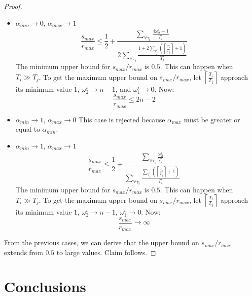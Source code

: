 \begin{proof}
\begin{itemize}
\item $\alpha_{min}\rightarrow0,\,\alpha_{max}\rightarrow1$
\begin{equation}
\frac{s_{max}}{r_{max}}\le\frac{1}{2}+\frac{\sum_{\forall\tau_{i}}\frac{4\omega_{2}^{i}-1}{T_{i}}}{2\sum_{\forall\tau_{i}}\frac{1+2\sum_{\tau_{j}^{*}}\left(\left\lceil \frac{T_{i}}{T_{j}}\right\rceil +1\right)}{T_{i}}}\label{eq:lcm rma lock-free comparison 4}
\end{equation}
The minimum upper bound for $s_{max}/r_{max}$ is $0.5$. This can
happen when $T_{i}\gg T_{j}$. To get the maximum upper bound on $s_{max}/r_{max}$,
let $\left\lceil \frac{T_{i}}{T_{j}}\right\rceil $ approach its
minimum value $1$, $\omega_{2}^{i}\rightarrow n-1$, and $\omega_{1}^{i}\rightarrow0$. 
Now:
\[
\frac{s_{max}}{r_{max}}\le2n-2
\]

\item $\alpha_{min}\rightarrow1,\,\alpha_{max}\rightarrow0$
This case is rejected because $\alpha_{max}$ must be greater or equal
to $\alpha_{min}$.

\item $\alpha_{min}\rightarrow1,\,\alpha_{max}\rightarrow1$
\begin{equation}
\frac{s_{max}}{r_{max}}\le\frac{1}{2}+\frac{\sum_{\forall\tau_{i}}\frac{\omega_{2}^{i}}{T_{i}}}{\sum_{\forall\tau_{i}}\frac{\sum_{\tau_{j}^{*}}\left(\left\lceil \frac{T_{i}}{T_{j}}\right\rceil +1\right)}{T_{i}}}\label{eq:lcm rma lock-free comparison 5}
\end{equation}
The minimum upper bound for $s_{max}/r_{max}$ is $0.5$. This can
happen when $T_{i}\gg T_{j}$. To get the maximum upper bound on $s_{max}/r_{max}$,
let $\left\lceil \frac{T_{i}}{T_{j}}\right\rceil $ approach its
minimum value $1$, $\omega_{2}^{i}\rightarrow n-1,\,\omega_{1}^{i}\rightarrow0$.
Now:  
\[
\frac{s_{max}}{r_{max}}\rightarrow\infty
\]

\end{itemize}
From the previous cases, we can derive that the upper bound on $s_{max}/r_{max}$
extends from $0.5$ to large values. Claim follows.
\end{proof}

\section{Conclusions}
\label{sec:conclusions_lcm}

